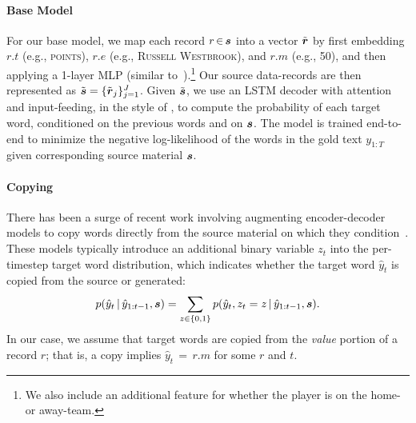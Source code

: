 \documentclass[11pt,letterpaper]{article}
\begin{document}
\paragraph{Base Model}

For our base model, we map each record $r \, {\in} \, \boldsymbol{s}$ into a vector $\tilde{\boldsymbol{r}}$  by first embedding $r.t$ (e.g., \textsc{points}), $r.e$ (e.g., \textsc{Russell Westbrook}), and $r.m$ (e.g., 50), and then applying a 1-layer MLP (similar to~\citet{yang2016reference}).\footnote{We also include an additional feature for whether the player is on the home- or away-team.} Our source data-records are then represented as $\tilde{\boldsymbol{s}} = \{\tilde{\boldsymbol{r}}_j\}_{j=1}^J$. Given $\tilde{\boldsymbol{s}}$, we use an LSTM decoder with attention and input-feeding, in the style of \citet{luong2015effective}, to compute the probability of each target word, conditioned on the previous words and on $\boldsymbol{s}$. The model is trained end-to-end to minimize the negative log-likelihood of the words in the gold text $y_{1:T}$ given corresponding source material $\boldsymbol{s}$.

\paragraph{Copying}

There has been a surge of recent work involving augmenting encoder-decoder models to copy words directly from the source material on which they condition~\cite{gu2016incorporating,gulcehre2016pointing,
merity2016pointer,jia2016data,yang2016reference}.
These  models typically introduce an additional binary variable $z_t$ into the per-timestep target word distribution, which indicates whether the target word $\hat{y}_t$ is copied from the source or generated: 
\begin{align*} 
p(\hat{y}_t \,|\, \hat{y}_{1:t-1}, \boldsymbol{s}) = \sum_{z \in \{0,1\}} p(\hat{y}_t, z_t = z \,|\, \hat{y}_{1:t-1}, \boldsymbol{s}).
\end{align*}
In our case, we assume that target words are copied from the \textit{value} portion of a record $r$; that is, a copy implies $\hat{y}_t \, {=} \, r.m$ for some $r$ and $t$.
\end{document}
